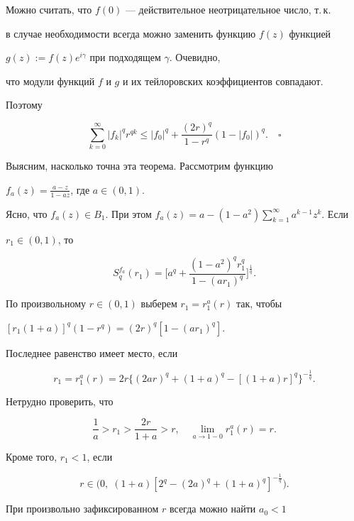 Можно считать, что $f(0)$ --- действительное неотрицательное число, т.\,к.


в случае необходимости всегда можно заменить функцию $f(z)$ функцией


$g(z):=f(z)e^{i\gamma}$ при подходящем $\gamma$. Очевидно,


что модули функций $f$ и $g$ и их тейлоровских коэффициентов совпадают.


Поэтому


$$


\sum\limits^{\infty}_{k=0}|f_k|^qr^{qk}\leq|f_0|^q+\frac{(2r)^q}{1-r^q}


(1-|f_0|)^q.\quad\square


$$





Выясним, насколько точна эта теорема. Рассмотрим функцию


$f_a(z)=\frac{a-z}{1-az}$, где $a\in(0,1)$.


Ясно, что $f_a(z)\in B_1$. При этом $f_a(z)=a-(1-a^2)


\sum\limits^{\infty}_{k=1}a^{k-1}z^k$. Если


$r_1\in(0,1)$, то


$$


S^{f_a}_{q}(r_1)=\bigg[a^q+\frac{(1-a^2)^qr_1^q}{1-(ar_1)^q}\bigg]^


{\frac{1}{q}}.


$$


По произвольному $r\in(0,1)$ выберем $r_1=r_1^a(r)$ так, чтобы


$[r_1(1+a)]^q(1-r^q)=(2r)^q[1-(ar_1)^q]$.


Последнее равенство имеет место, если


$$


r_1=r_1^a(r)=2r\{(2ar)^q+(1+a)^q-[(1+a)r]^q\}^{-\frac{1}{q}}.


$$


Нетрудно проверить, что


$$\frac{1}{a}>r_1>\frac{2r}{1+a}>r,\quad


\lim_{a\to 1-0}r^a_1(r)=r.


$$


Кроме того, $r_1<1$, если


$$


r\in\bigl(0,\;(1+a)[2^q-(2a)^q+(1+a)^q]^{-\frac{1}{q}}\bigr).


$$


При произвольно зафиксированном $r$ всегда можно найти $a_0<1$



